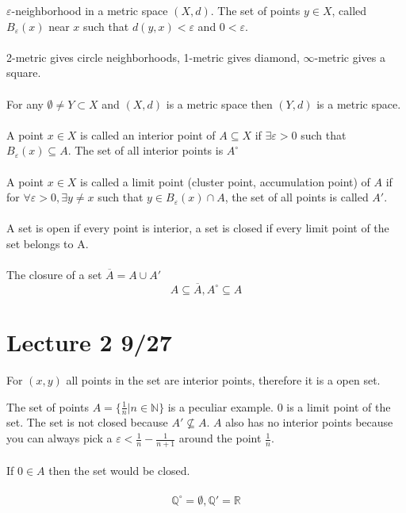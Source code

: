 \documentclass[12pt]{article}
\begin{document}
$\varepsilon$-neighborhood in a metric space $(X,d)$. The set of points $y \in X$, called $B_\varepsilon (x) $ near $x$ such that $d(y,x) < \varepsilon$ and $0 < \varepsilon$.\\\\
2-metric gives circle neighborhoods, 1-metric gives diamond, $\infty$-metric gives a square. \\\\
For any $\emptyset \neq Y \subset X$ and $(X,d)$ is a metric space then $(Y,d)$ is a metric space.
\\\\
A point  $x \in X$ is called an interior point of $A \subseteq X$ if $\exists \varepsilon > 0$ such that $B_\varepsilon (x) \subseteq A$. The set of all interior points is $A^\circ$\\\\

A point $x \in X$ is called a limit point (cluster point, accumulation point) of $A$ if for $\forall \varepsilon > 0, \exists y \neq x$ such that $y \in B_\varepsilon(x) \cap A$, the set of all points is called $A'$. \\\\
A set is open if every point is interior, a set is closed if every limit point of the set belongs to A. 
\\\\
The closure of a set $\overline A = A \cup A'$
$$A \subseteq \overline{A}, A^\circ \subseteq A$$
\newpage
\section{Lecture 2 9/27}

For $(x,y)$ all points in the set are interior points, therefore it is a open set. 

The set of points $A = \{\frac 1 n | n \in \mathbb{N}\}$ is a peculiar example. $0$ is a limit point of the set. The set is not closed because $A' \not \subseteq A$. $A$ also has no interior points because you can always pick a $\varepsilon < \frac 1n - \frac{1}{n+1}$ around the point $\frac 1n$.  \\\\
If $0 \in A$ then the set would be closed. \\\\
$$\mathbb{Q}^\circ = \emptyset, \mathbb{Q}' = \mathbb{R}$$
\end{document}
